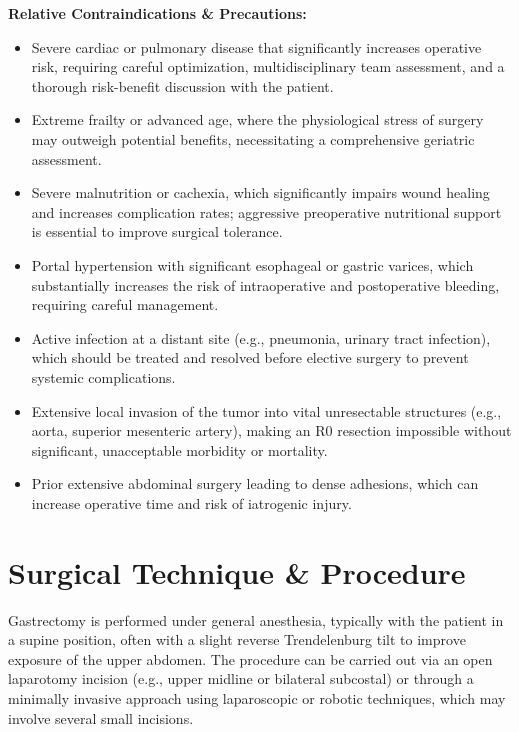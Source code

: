 \textbf{Relative Contraindications \& Precautions:}
\begin{itemize}
  \item Severe cardiac or pulmonary disease that significantly increases operative risk, requiring careful optimization, multidisciplinary team assessment, and a thorough risk-benefit discussion with the patient.
  \item Extreme frailty or advanced age, where the physiological stress of surgery may outweigh potential benefits, necessitating a comprehensive geriatric assessment.
  \item Severe malnutrition or cachexia, which significantly impairs wound healing and increases complication rates; aggressive preoperative nutritional support is essential to improve surgical tolerance.
  \item Portal hypertension with significant esophageal or gastric varices, which substantially increases the risk of intraoperative and postoperative bleeding, requiring careful management.
  \item Active infection at a distant site (e.g., pneumonia, urinary tract infection), which should be treated and resolved before elective surgery to prevent systemic complications.
  \item Extensive local invasion of the tumor into vital unresectable structures (e.g., aorta, superior mesenteric artery), making an R0 resection impossible without significant, unacceptable morbidity or mortality.
  \item Prior extensive abdominal surgery leading to dense adhesions, which can increase operative time and risk of iatrogenic injury.
\end{itemize}

\section*{Surgical Technique \& Procedure}
Gastrectomy is performed under general anesthesia, typically with the patient in a supine position, often with a slight reverse Trendelenburg tilt to improve exposure of the upper abdomen. The procedure can be carried out via an open laparotomy incision (e.g., upper midline or bilateral subcostal) or through a minimally invasive approach using laparoscopic or robotic techniques, which may involve several small incisions.

